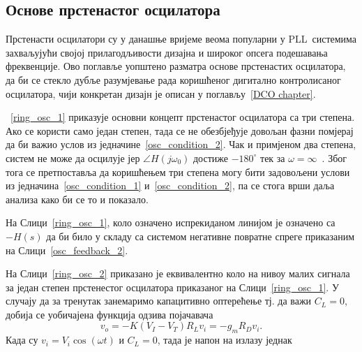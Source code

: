 \documentclass[master]{finthesis}
\def \PLL  {PLL} %
\begin{document}
\subsection{Основе прстенастог осцилатора}
Прстенасти осцилатори су у данашње вријеме веома популарни у \PLL\ системима захваљујући својој прилагодљивости дизајна и широког опсега подешавања фреквенције. Ово поглавље уопштено разматра основе прстенастих осцилатора, да би се стекло дубље разумјевање рада коришћеног дигитално контролисаног осцилатора, чији конкретан дизајн је описан у поглављу~\ref{DCO chapter}. \par
\figurename~\ref{ring_osc_1} приказује основни концепт прстенастог осцилатора са три степена. Ако се користи само један степен, тада се не обезбјеђује довољан фазни помјерај да би важио услов из једначине~\ref{osc_condition_2}. Чак и примјеном два степена, систем не може да осцилује јер $\angle H(j\omega_{0})$ достиже $-180^{\circ}$ тек за $\omega=\infty$~\cite{Razavi:PLL_CMOS_2020}. Због тога се претпоставља да коришћењем три степена могу бити задовољени услови из једначина~\ref{osc_condition_1} и~\ref{osc_condition_2}, па се стога врши даља анализа како би се то и показало. \par 
На Слици~\ref{ring_osc_1}, коло означено испрекиданом линијом је означено са $-H(s)$ да би било у складу са системом негативне повратне спреге приказаним на Слици~\ref{osc_feedback_2}. \par


На Слици~\ref{ring_osc_2} приказано је еквивалентно коло на нивоу малих сигнала за један степен прстенестог осцилатора приказаног на Слици~\ref{ring_osc_1}. У случају да за тренутак занемаримо капацитивно оптерећење тј. да важи $C_{L}=0$, добија се уобичајена функција одзива појачавача
\begin{equation} 
	\label{osc_feedback_eq_9_0_1}
	v_{o} = -K(V_{I} - V_{T})R_{L}v_{i} = -g_{m}R_{D}v_{i}.
\end{equation}
Када су $v_{i}=V_{i}\cos (\omega t)$ и $C_{L}=0$, тада је напон на излазу једнак
\end{document}
